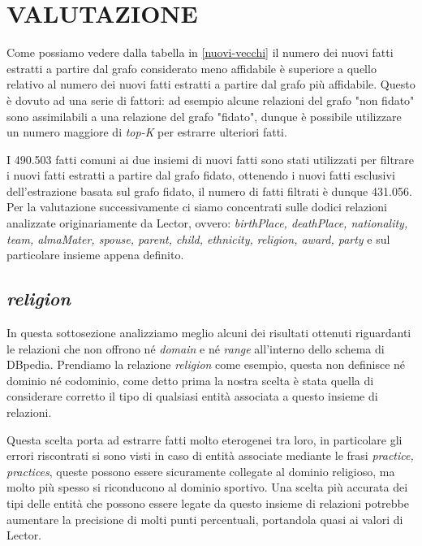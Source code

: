 \documentclass[10pt,a4paper,twocolumn]{article}
\begin{document}
\section{VALUTAZIONE}

Come possiamo vedere dalla tabella in \ref{nuovi-vecchi} il numero dei nuovi fatti estratti a partire dal grafo considerato meno affidabile è superiore a quello relativo al numero dei nuovi fatti estratti a partire dal grafo più affidabile. Questo è dovuto ad una serie di fattori: ad esempio alcune relazioni del grafo "non fidato" sono assimilabili a una relazione del grafo "fidato", dunque è possibile utilizzare un numero maggiore di \textit{top-K} per estrarre ulteriori fatti.

I 490.503 fatti comuni ai due insiemi di nuovi fatti sono stati utilizzati per filtrare i nuovi fatti estratti a partire dal grafo fidato, ottenendo i nuovi fatti esclusivi dell'estrazione basata sul grafo fidato, il numero di fatti filtrati è dunque 431.056. Per la valutazione successivamente ci siamo concentrati sulle dodici relazioni analizzate originariamente da Lector, ovvero:
\textit{birthPlace, deathPlace, nationality, team, almaMater, spouse, parent, child, ethnicity, religion, award, party} e sul particolare insieme appena definito.

\subsection{\textit{religion}}

In questa sottosezione analizziamo meglio alcuni dei risultati ottenuti riguardanti le relazioni che non offrono né \textit{domain} e né \textit{range} all'interno dello schema di DBpedia. Prendiamo la relazione \textit{religion} come esempio, questa non definisce né dominio né codominio, come detto prima la nostra scelta è stata quella di considerare corretto il tipo di qualsiasi entità associata a questo insieme di relazioni.

Questa scelta porta ad estrarre fatti molto eterogenei tra loro, in particolare gli errori riscontrati si sono visti in caso di entità associate mediante le frasi \textit{practice, practices}, queste possono essere sicuramente collegate al dominio religioso, ma molto più spesso si riconducono al dominio sportivo. Una scelta più accurata dei tipi delle entità che possono essere legate da questo insieme di relazioni potrebbe aumentare la precisione di molti punti percentuali, portandola quasi ai valori di Lector.
\end{document}
